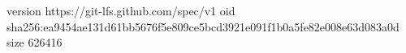 version https://git-lfs.github.com/spec/v1
oid sha256:ea9454ae131d61bb5676f5e809ce5bcd3921e091f1b0a5fe82e008e63d083a0d
size 626416
